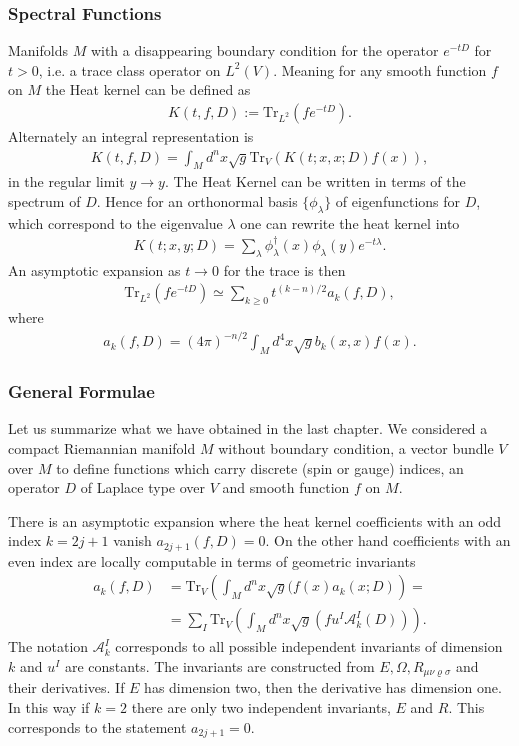\subsubsection{Spectral Functions}
Manifolds $M$ with a disappearing boundary condition for the operator
$e^{-tD}$ for $t>0$, i.e. a trace class operator on $L^2(V)$. Meaning for any
smooth function $f$ on $M$ the Heat kernel can be defined as
\begin{align}
    K(t,f,D) := \text{Tr}_{L^2}(fe^{-tD}).
\end{align}
Alternately an integral representation is
\begin{align}
    K(t, f, D) = \int_M d^n x \sqrt{g} \text{Tr}_V(K(t;x,x;D)f(x)),
\end{align}
in the regular limit $y \rightarrow y$. The Heat Kernel can be written in terms
of the spectrum of $D$. Hence for an orthonormal basis $\{\phi_\lambda\}$ of
eigenfunctions for $D$, which correspond to the eigenvalue $\lambda$ one
can rewrite the heat kernel into
\begin{align}
    K(t;x,y;D) = \sum_\lambda \phi^\dagger_\lambda(x)
    \phi_\lambda(y)e^{-t\lambda}.
\end{align}
An asymptotic expansion as $t \rightarrow 0$ for the trace is then
\begin{align}
    \text{Tr}_{L^2}(fe^{-tD}) \simeq \sum_{k\geq 0}t^{(k-n)/2}a_k(f,D),
\end{align}
where
\begin{align}
    a_k(f,D) = (4\pi)^{-n/2} \int_M d^4x \sqrt{g} b_k(x,x) f(x).
\end{align}
\subsubsection{General Formulae}
Let us summarize what we have obtained in the last chapter. We considered a
compact Riemannian manifold $M$ without boundary condition, a vector bundle
$V$ over $M$ to define functions which carry discrete (spin or gauge)
indices, an operator $D$ of Laplace type over $V$ and smooth function $f$ on
$M$.

There is an asymptotic expansion where the heat kernel coefficients with an
odd index $k=2j+1$ vanish $a_{2j+1}(f,D) = 0$. On the other hand coefficients
with an even index are locally computable in terms of geometric invariants
\begin{align}
    a_k(f,D) &= \text{Tr}_V\left(\int_M d^n x\sqrt{g}(f(x)a_k(x;D)\right)
    =\nonumber\\
    &=\sum_I \text{Tr}_V\left(\int_M d^nx \sqrt{g}(fu^I
    \mathcal{A}^I_k(D))\right).
\end{align}
The notation $\mathcal{A}^I_k$ corresponds to all possible independent invariants of
dimension $k$ and $u^I$ are constants. The invariants are constructed from
$E, \Omega, R_{\mu\nu\varrho\sigma}$ and their derivatives. If $E$ has
dimension two, then the derivative has dimension one. In this way if $k=2$ there are
only two independent invariants, $E$ and $R$. This corresponds to the
statement $a_{2j+1}=0$.


